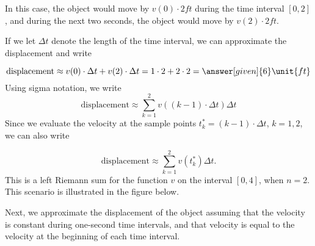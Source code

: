 \documentclass{ximera}
\begin{document}
\begin{example}
\begin{explanation}
In this case,  the object would move by $v(0)\cdot2 \unit{ft}$ during the time interval $[0,2]$, and during the next two seconds, the object would move by $v(2)\cdot2 \unit{ft}$.
 
  
If we let $\Delta t$ denote the length of the time interval, we can approximate the displacement  and write

  \[
   \text{displacement}\approx v(0)\cdot\Delta t+v(2)\cdot\Delta t=1\cdot2+2\cdot2=\answer[given]{6} \unit{ft}
  \]
Using sigma notation, we write
\[
   \text{displacement}\approx \sum_{k=1}^2v((k-1)\cdot\Delta t)\Delta t
  \]
Since we evaluate the velocity at the sample points $t_{k}^*=(k-1)\cdot\Delta t$, $k=1,2$, we can also  write

\[
   \text{displacement}\approx \sum_{k=1}^2v(t_{k}^*)\Delta t.
  \]
  This is a left Riemann sum for the function $v$ on the interval $[0,4]$, when $n=2$.
This scenario is illustrated in the figure below.
\begin{image}
\end{image}
Next, we approximate the displacement of the object assuming that the velocity is constant during one-second time intervals, and that velocity is equal to the velocity at the beginning of each time interval.



\end{explanation}
\end{example}
\end{document}
